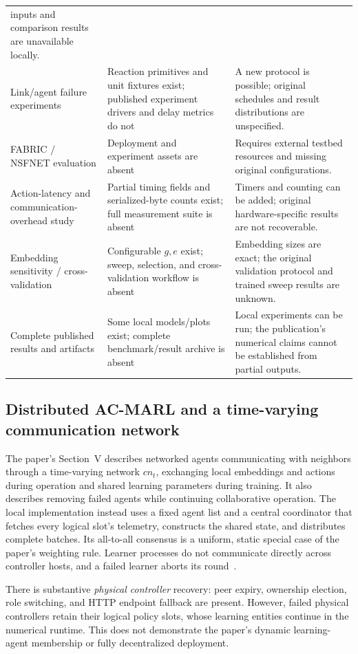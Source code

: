 \documentclass[11pt,a4paper]{article}
\begin{document}
\begin{longtable}{@{}P{0.25\textwidth}P{0.32\textwidth}P{0.36\textwidth}@{}}
inputs and comparison results are unavailable locally. \\
Link/agent failure experiments & Reaction primitives and unit fixtures exist;
published experiment drivers and delay metrics do not & A new protocol is
possible; original schedules and result distributions are unspecified. \\
FABRIC / NSFNET evaluation & Deployment and experiment assets are absent &
Requires external testbed resources and missing original configurations. \\
Action-latency and communication-overhead study & Partial timing fields and
serialized-byte counts exist; full measurement suite is absent & Timers and
counting can be added; original hardware-specific results are not recoverable. \\
Embedding sensitivity / cross-validation & Configurable $g,e$ exist; sweep,
selection, and cross-validation workflow is absent & Embedding sizes are exact;
the original validation protocol and trained sweep results are unknown. \\
Complete published results and artifacts & Some local models/plots exist;
complete benchmark/result archive is absent & Local experiments can be run;
the publication's numerical claims cannot be established from partial outputs. \\
\end{longtable}
\endgroup

\subsection{Distributed AC-MARL and a time-varying communication network}
\label{sec:gap-distributed}

The paper's Section~V describes networked agents communicating with neighbors
through a time-varying network $cn_t$, exchanging local embeddings and actions
during operation and shared learning parameters during training. It also
describes removing failed agents while continuing collaborative operation.
The local implementation instead uses a fixed agent list and a central
coordinator that fetches every logical slot's telemetry, constructs the shared
state, and distributes complete batches. Its all-to-all consensus is a
uniform, static special case of the paper's weighting rule. Learner processes
do not communicate directly across controller hosts, and a failed learner
aborts its round~\cite{paper,code-workers,code-env}.

There is substantive \emph{physical controller} recovery: peer expiry,
ownership election, role switching, and HTTP endpoint fallback are present.
However, failed physical controllers retain their logical policy slots, whose
learning entities continue in the numerical runtime. This does not demonstrate
the paper's dynamic learning-agent membership or fully decentralized deployment.
\end{document}
